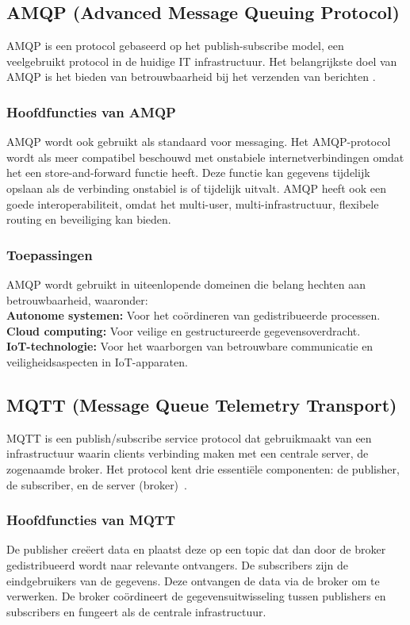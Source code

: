 \subsection{AMQP (Advanced Message Queuing Protocol)} 
AMQP is een protocol gebaseerd op het publish-subscribe model, een veelgebruikt protocol in de huidige IT infrastructuur.
Het belangrijkste doel van AMQP is het bieden van betrouwbaarheid bij het verzenden van berichten \autocite{Adiono2020}.  

\subsubsection{Hoofdfuncties van AMQP}
AMQP wordt ook gebruikt als standaard voor messaging. 
Het AMQP-protocol wordt als meer compatibel beschouwd met onstabiele internetverbindingen omdat het een store-and-forward functie heeft. 
Deze functie kan gegevens tijdelijk opslaan als de verbinding onstabiel is of tijdelijk uitvalt. 
AMQP heeft ook een goede interoperabiliteit, omdat het multi-user, multi-infrastructuur, flexibele routing en beveiliging kan bieden.
 
\subsubsection{Toepassingen}
AMQP wordt gebruikt in uiteenlopende domeinen die belang hechten aan betrouwbaarheid, waaronder:
\\
\textbf{Autonome systemen:} Voor het coördineren van gedistribueerde processen. \\ 
\textbf{Cloud computing:} Voor veilige en gestructureerde gegevensoverdracht.  \\
\textbf{IoT-technologie:} Voor het waarborgen van betrouwbare communicatie en veiligheidsaspecten in IoT-apparaten.

\subsection{MQTT (Message Queue Telemetry Transport)}
MQTT is een publish/subscribe service protocol dat gebruikmaakt van een infrastructuur waarin clients verbinding maken met een centrale server, de zogenaamde broker. 
Het protocol kent drie essentiële componenten: de publisher, de subscriber, en de server (broker)~\autocite{Usmani2021}.

\subsubsection{Hoofdfuncties van MQTT}
De publisher creëert data en plaatst deze op een topic dat dan door de broker gedistribueerd wordt naar relevante ontvangers.
De subscribers zijn de eindgebruikers van de gegevens. Deze ontvangen de data via de broker om te verwerken.
De broker coördineert de gegevensuitwisseling tussen publishers en subscribers en fungeert als de centrale infrastructuur.


